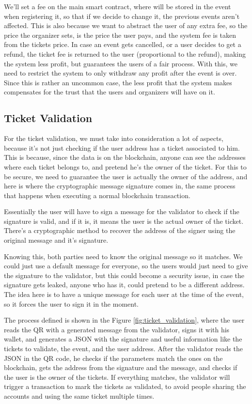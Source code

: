 We'll set a fee on the main smart contract, where will be stored in the event
when registering it, so that if we decide to change it, the previous events
aren't affected. This is also because we want to abstract the user of any extra
fee, so the price the organizer sets, is the price the user pays, and the
system fee is taken from the tickets price. In case an event gets cancelled, or
a user decides to get a refund, the ticket fee is returned to the user
(proportional to the refund), making the system less profit, but guarantees the
users of a fair process. With this, we need to restrict the system to only
withdraw any profit after the event is over. Since this is rather an uncommon
case, the less profit that the system makes compensates for the trust that the
users and organizers will have on it.

\subsection{Ticket Validation}
\label{subsec:ticket_validation}

For the ticket validation, we must take into consideration a lot of aspects,
because it's not just checking if the user address has a ticket associated to
him. This is because, since the data is on the blockchain, anyone can see the
addresses where each ticket belongs to, and pretend he's the owner of the
ticket. For this to be secure, we need to guarantee the user is actually the
owner of the address, and here is where the cryptographic message signature
comes in, the same process that happens when executing a normal blockchain
transaction.

Essentially the user will have to sign a message for the validator to check if
the signature is valid, and if it is, it means the user is the actual owner of
the ticket. There's a cryptographic method to recover the address of the signer
using the original message and it's signature.

Knowing this, both parties need to know the original message so it matches. We
could just use a default message for everyone, so the users would just need to
give the signature to the validator, but this could become a security issue, in
case the signature gets leaked, anyone who has it, could pretend to be a
different address. The idea here is to have a unique message for each user at
the time of the event, so it forces the user to sign it in the moment.

The process defined is shown in the Figure \ref{fig:ticket_validation}, where
the user reads the QR with a generated message from the validator, signs it
with his wallet, and generates a JSON with the signature and useful information
like the tickets to validate, the event, and the user address. After the
validator reads the JSON in the QR code, he checks if the parameters match the
ones on the blockchain, gets the address from the signature and the message,
and checks if the user is the owner of the tickets. If everything matches, the
validator will trigger a transaction to mark the tickets as validated, to avoid
people sharing the accounts and using the same ticket multiple times.

